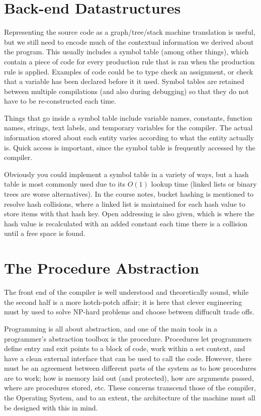 \section{Back-end Datastructures}

Representing the source code as a graph/tree/stack machine translation
is useful, but we still need to encode much of the contextual
information we derived about the program. This usually includes a
symbol table (among other things), which contain a piece of code for
every production rule that is ran when the production rule is
applied. Examples of code could be to type check an assignment, or
check that a variable has been declared before it it used. Symbol
tables are retained between multiple compilations (and also during
debugging) so that they do not have to be re-constructed each time.

Things that go inside a symbol table include variable names,
constants, function names, strings, text labels, and temporary
variables for the compiler. The actual information stored about each
entity varies according to what the entity actually is. Quick access
is important, since the symbol table is frequently accessed by the
compiler.

Obviously you could implement a symbol table in a variety of ways, but
a hash table is most commonly used due to its $O(1)$ lookup time
(linked lists or binary trees are worse alternatives). In the course
notes, bucket hashing is mentioned to resolve hash collisions, where a
linked list is maintained for each hash value to store items with that
hash key. Open addressing is also given, which is where the hash value
is recalculated with an added constant each time there is a collision
until a free space is found.


\section{The Procedure Abstraction}

The front end of the compiler is well understood and theoretically
sound, while the second half is a more hotch-potch affair; it is here
that clever engineering must by used to solve NP-hard problems and
choose between diffucult trade offs.

Programming is all about abstraction, and one of the main tools in a
programmer's abstraction toolbox is the procedure. Procedures let
programmers define entry and exit points to a block of code, work
within a set context, and have a clean external interface that can be
used to call the code. However, there must be an agreement between
different parts of the system as to how procedures are to work; how is
memory laid out (and protected), how are arguments passed, where are
procedures stored, etc. These concerns transcend those of the
compiler, the Operating System, and to an extent, the architecture of
the machine must all be designed with this in mind.

